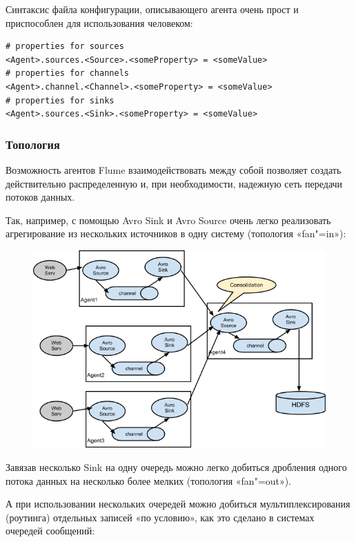 \documentclass[10pt, a5paper]{article}
\begin{document}
Синтаксис файла конфигурации, описывающего агента очень прост и приспособлен для использования человеком:

\begin{verbatim}
# properties for sources 
<Agent>.sources.<Source>.<someProperty> = <someValue>
# properties for channels 
<Agent>.channel.<Channel>.<someProperty> = <someValue>
# properties for sinks 
<Agent>.sources.<Sink>.<someProperty> = <someValue> 
\end{verbatim}
\subsubsection*{Топология}

Возможность агентов Flume взаимодействовать между собой позволяет создать действительно распределенную и, при необходимости, надежную сеть передачи потоков данных.

Так, например, с помощью Avro Sink и Avro Source очень легко реализовать агрегирование из нескольких источников в одну систему (топология «fan"=in»):


\begin{figure}[h!]
  \centering
  \includegraphics[scale=0.5]{21_2014_UserGuide_image02.png}
\end{figure}

Завязав несколько Sink на одну очередь можно легко добиться дробления одного потока данных на несколько более мелких (топология «fan"=out»).

А при использовании нескольких очередей можно добиться мультиплексирования (роутинга) отдельных записей «по условию», как это сделано в системах очередей сообщений:
\end{document}
